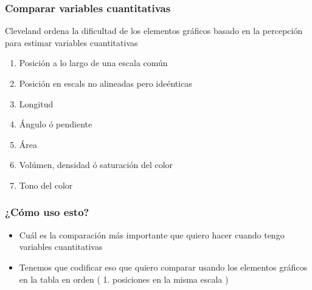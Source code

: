 \documentclass[9pt, spanish]{beamer}\usepackage[]{graphicx}\usepackage[]{color}
\begin{document}
\begin{frame}
\frametitle{Comparar variables cuantitativas}
Cleveland ordena la dificultad de los elementos 
gr\'aficos basado en la percepci\'on para estimar variables cuantitativas

\begin{enumerate}
\item Posici\'on a lo largo de una escala com\'un
\item Posici\'on en escals no alineadas pero ide\'enticas
\item Longitud
\item \'Angulo \'o pendiente
\item \'Area
\item Vol\'umen, densidad \'o saturaci\'on del color
\item Tono del color
\end{enumerate}
\end{frame}

\begin{frame}
\frametitle{¿C\'omo uso esto?}
\begin{itemize}
\item Cu\'al es la comparaci\'on m\'as importante que quiero hacer cuando tengo variables cuantitativas
\item Tenemos que codificar eso que quiero comparar usando los elementos gr\'aficos en la tabla en orden ( 1. posiciones en la misma escala )
\end{itemize}
\end{frame}
\end{document}
